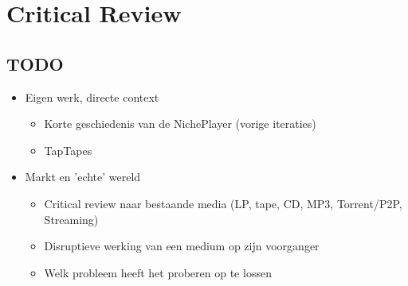 \section{Critical Review}
\captionsetup[figure]{font=small,labelfont=bf}

\subsection*{TODO}

\begin{itemize}
    \item Eigen werk, directe context
    \begin{itemize}
        \item Korte geschiedenis van de NichePlayer (vorige iteraties)
        \item TapTapes
    \end{itemize}
    \item Markt en 'echte' wereld
    \begin{itemize}
        \item Critical review naar bestaande media (LP, tape, CD, MP3, Torrent/P2P, Streaming)
        \item Disruptieve werking van een medium op zijn voorganger
        \item Welk probleem heeft het proberen op te lossen
    \end{itemize}
\end{itemize}